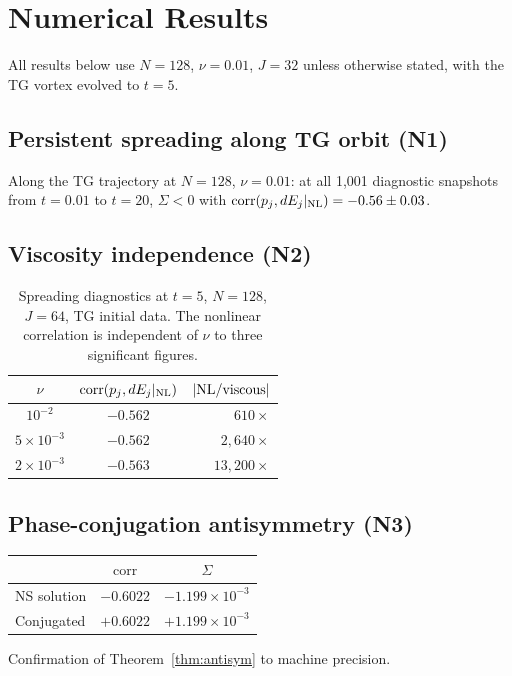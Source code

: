 \documentclass[11pt]{article}
\theoremstyle{definition}
\DeclareMathOperator{\corr}{corr}
\begin{document}
\section{Numerical Results}
\label{sec:results}

All results below use $N=128$, $\nu=0.01$, $J=32$
unless otherwise stated, with the TG vortex evolved to
$t=5$.

\subsection{Persistent spreading along TG orbit (N1)}

Along the TG trajectory at $N=128$, $\nu=0.01$:
at all 1{,}001 diagnostic snapshots from $t=0.01$ to
$t=20$, $\Sigma < 0$ with
$\corr(p_j,dE_j|_{\rm NL}) = -0.56\pm 0.03$.

\subsection{Viscosity independence (N2)}

\begin{table}[h]
\centering
\caption{Spreading diagnostics at $t=5$, $N=128$, $J=64$,
TG initial data.  The nonlinear correlation is independent
of $\nu$ to three significant figures.}
\label{tab:nu}
\begin{tabular}{@{}ccr@{}}
\toprule
$\nu$ & $\corr(p_j,dE_j|_{\rm NL})$
  & $|{\rm NL}/{\rm viscous}|$ \\
\midrule
$10^{-2}$          & $-0.562$ & $610\times$ \\
$5\times 10^{-3}$  & $-0.562$ & $2{,}640\times$ \\
$2\times 10^{-3}$  & $-0.563$ & $13{,}200\times$ \\
\bottomrule
\end{tabular}
\end{table}

\subsection{Phase-conjugation antisymmetry (N3)}

\begin{center}
\begin{tabular}{@{}lcc@{}}
\toprule
& $\corr$ & $\Sigma$ \\
\midrule
NS solution     & $-0.6022$ & $-1.199\times 10^{-3}$ \\
Conjugated      & $+0.6022$ & $+1.199\times 10^{-3}$ \\
\bottomrule
\end{tabular}
\end{center}
Confirmation of Theorem~\ref{thm:antisym} to machine
precision.
\end{document}
